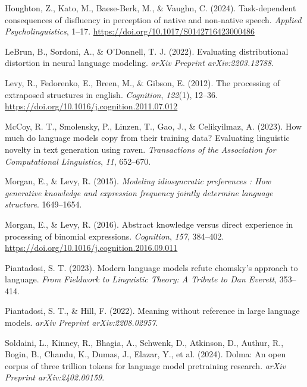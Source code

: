 \documentclass[
  nottoc]{article}
\newlength{\cslhangindent}
\newenvironment{CSLReferences}[2] %
 {\begin{list}{}{%
  \setlength{\itemindent}{0pt}
  \setlength{\leftmargin}{0pt}
  \setlength{\parsep}{0pt}
  \ifodd #1
   \setlength{\leftmargin}{\cslhangindent}
   \setlength{\itemindent}{-1\cslhangindent}
  \fi
  \setlength{\itemsep}{#2\baselineskip}}}
 {\end{list}}
\begin{document}
\begin{CSLReferences}{1}{0}
Houghton, Z., Kato, M., Baese-Berk, M., \& Vaughn, C. (2024).
Task-dependent consequences of disfluency in perception of native and
non-native speech. \emph{Applied Psycholinguistics}, 1--17.
\url{https://doi.org/10.1017/S0142716423000486}

LeBrun, B., Sordoni, A., \& O'Donnell, T. J. (2022). Evaluating
distributional distortion in neural language modeling. \emph{arXiv
Preprint arXiv:2203.12788}.

Levy, R., Fedorenko, E., Breen, M., \& Gibson, E. (2012). The processing
of extraposed structures in english. \emph{Cognition}, \emph{122}(1),
12--36. \url{https://doi.org/10.1016/j.cognition.2011.07.012}

McCoy, R. T., Smolensky, P., Linzen, T., Gao, J., \& Celikyilmaz, A.
(2023). How much do language models copy from their training data?
Evaluating linguistic novelty in text generation using raven.
\emph{Transactions of the Association for Computational Linguistics},
\emph{11}, 652--670.

Morgan, E., \& Levy, R. (2015). \emph{Modeling idiosyncratic preferences
: How generative knowledge and expression frequency jointly determine
language structure}. 1649--1654.

Morgan, E., \& Levy, R. (2016). Abstract knowledge versus direct
experience in processing of binomial expressions. \emph{Cognition},
\emph{157}, 384--402.
\url{https://doi.org/10.1016/j.cognition.2016.09.011}

Piantadosi, S. T. (2023). Modern language models refute chomsky's
approach to language. \emph{From Fieldwork to Linguistic Theory: A
Tribute to Dan Everett}, 353--414.

Piantadosi, S. T., \& Hill, F. (2022). Meaning without reference in
large language models. \emph{arXiv Preprint arXiv:2208.02957}.

Soldaini, L., Kinney, R., Bhagia, A., Schwenk, D., Atkinson, D., Authur,
R., Bogin, B., Chandu, K., Dumas, J., Elazar, Y., et al. (2024). Dolma:
An open corpus of three trillion tokens for language model pretraining
research. \emph{arXiv Preprint arXiv:2402.00159}.


\end{CSLReferences}
\end{document}
